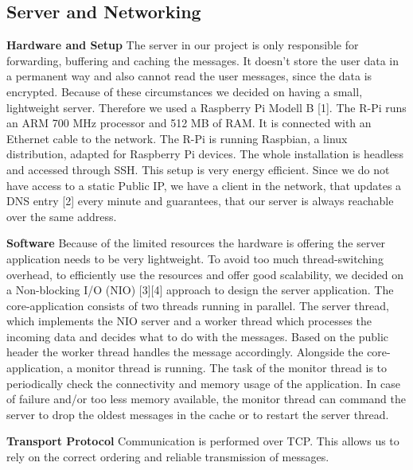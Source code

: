 \documentclass{report}
\begin{document}
\subsection{Server and Networking}
\textbf{Hardware and Setup}\newline
\indent The server in our project is only responsible for forwarding, buffering and caching the messages. It doesn't store the user data in a permanent way and also cannot read the user messages, since the data is encrypted. 
Because of these circumstances we decided on having a small, lightweight server. Therefore we used a Raspberry Pi Modell B [1]. The R-Pi runs an ARM 700 MHz processor and 512 MB of RAM. It is connected with an Ethernet cable to the network.
The R-Pi is running Raspbian, a linux distribution, adapted for Raspberry Pi devices. The whole installation is headless and accessed through SSH. This setup is very energy efficient. 
Since we do not have access to a static Public IP, we have a client in the network, that updates a DNS entry [2] every minute and guarantees, that our server is always reachable over the same address. 

\textbf{Software}\newline
\indent Because of the limited resources the hardware is offering the server application needs to be very lightweight. To avoid too much thread-switching overhead, to efficiently use the resources and offer good scalability, we decided on a Non-blocking I/O (NIO) [3][4] approach to design the server application. The core-application consists of two threads running in parallel. The server thread, which implements the NIO server and a worker thread which processes the incoming data and decides what to do with the messages. Based on the public header the worker thread handles the message accordingly.
Alongside the core-application, a monitor thread is running. The task of the monitor thread is to periodically check the connectivity and memory usage of the application. In case of failure and/or too less memory available, the monitor thread can command the server to drop the oldest messages in the cache or to restart the server thread. 

\textbf{Transport Protocol}\newline
\indent Communication is performed over TCP. This allows us to rely on the correct ordering and reliable transmission of messages.
\end{document}
